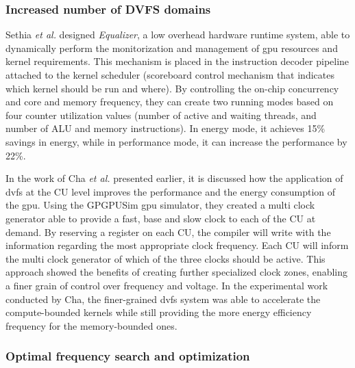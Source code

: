 \subsubsection{Increased number of DVFS domains}


Sethia \textit{et al.} \cite{sethia_equalizer:_2014} designed \textit{Equalizer}, a low overhead hardware runtime system, able to dynamically perform the monitorization and management of \acrshort{gpu} resources and kernel requirements. This mechanism is placed in the instruction decoder pipeline attached to the kernel scheduler (scoreboard control mechanism that indicates which kernel should be run and where). By controlling the on-chip concurrency and core and memory frequency, they can create two running modes based on four counter utilization values (number of active and waiting threads, and number of ALU and memory instructions). In energy mode, it achieves 15\% savings in energy, while in performance mode, it can increase the performance by 22\%.

In the work of Cha \textit{et al.} \cite{cha_core-level_2018} presented earlier, it is discussed how the application of \acrshort{dvfs} at the CU level improves the performance and the energy consumption of the \acrshort{gpu}. Using the GPGPUSim \acrshort{gpu} simulator, they created a multi clock generator able to provide a fast, base and slow clock to each of the CU at demand.  By reserving a register on each CU, the compiler will write with the information regarding the most appropriate clock frequency. Each CU will inform the multi clock generator of which of the three clocks should be active. This approach showed the benefits of creating further specialized clock zones, enabling a finer grain of control over frequency and voltage. In the experimental work conducted by Cha, the finer-grained \acrshort{dvfs} system was able to accelerate the compute-bounded kernels while still providing the more energy efficiency frequency for the memory-bounded ones.

\subsubsection{Optimal frequency search and optimization}

